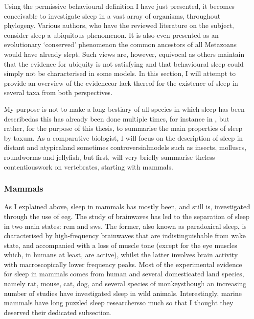 Using the permissive behavioural definition I have just presented,
it becomes conceivable to investigate sleep in a vast array of organisms, throughout phylogeny.
Various authors, who have the reviewed literature on the subject, consider sleep a ubiquitous phenomenon\cite{campbell_animal_1984,cirelli_is_2008,joiner_unraveling_2016}.
It is also even presented as  an evolutionary `conserved' phenomenon\cite{vorster_sleep_2015,zimmerman_conservation_2008}\emd{}\ie{}
the common ancestors of all Metazoans would have already slept.
Such views are, however, equivocal as others maintain that the evidence for ubiquity is not satisfying and that behavioural sleep could simply not be characterised in some models\cite{siegel_all_2008}.
In this section, I will attempt to provide an overview of the evidence\emd{}or lack thereof\emd{} for the existence of sleep in several taxa from both perspectives.

My purpose is not to make a long bestiary of all species in which sleep has been described\emd{}as this has already been done multiple times, for instance in \cite{campbell_animal_1984,lesku_phylogenetic_2006,zimmerman_conservation_2008,vorster_sleep_2015,joiner_unraveling_2016}\emd{}, 
but rather, for the purpose of this thesis, to summarise the main properties of sleep by taxum.
As a comparative biologist, I will focus on the description of sleep in distant and atypical\emd{}and sometimes controversial\emd{}models such as insects, molluscs, roundworms and jellyfish,
but first, will very briefly summarise the\emd{}less contentious\emd{}work on vertebrates, starting with mammals.


\subsubsection{Mammals}

As I explained above, sleep in mammals has mostly been, and still is, investigated through the use of \gls{eeg}.
The study of brainwaves has led to the separation of sleep in two main states: \gls{rem} and \gls{sws}.
The former, also known as paradoxical sleep, is characterised by high-frequency brainwaves that are indistinguishable from wake state, and accompanied with a loss of muscle tone (except for the eye muscles which, in humans at least, are active),
whilst the latter involves brain activity with macroscopically lower frequency peaks.
Most of the experimental evidence for sleep in mammals comes from human and several domesticated land species\cite{lesku_phylogenetic_2006,siegel_all_2008}, namely rat, mouse, cat, dog, and several species of monkeys\emd{}though an increasing number of studies have investigated sleep in wild animals\cite{staunton_mammalian_2005}.
Interestingly, marine mammals have long puzzled sleep researchers\emd{}so much so that I thought they deserved their dedicated subsection.

